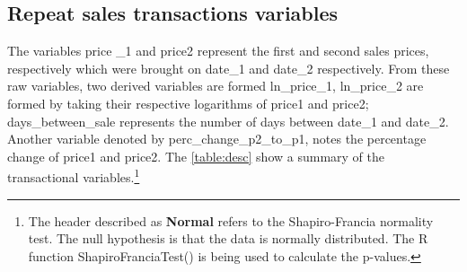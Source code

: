\documentclass[12pt]{article}
\begin{document}
\subsection{Repeat sales transactions variables}
The variables price \_1 and \gls{price2} represent the first and second sales prices, respectively which were brought on date\_1 and date\_2 respectively. From these raw variables, two derived variables are formed ln\_price\_1, ln\_price\_2 are formed by taking their respective logarithms of \gls{price1} and \gls{price2}; days\_between\_sale represents the number of days between date\_1 and date\_2. Another variable denoted by perc\_change\_p2\_to\_p1, notes the percentage change of \gls{price1} and \gls{price2}.
The \autoref{table:desc} show a summary of the transactional variables.\footnote{The header described as \textbf{Normal} refers to the Shapiro-Francia normality test. The null hypothesis is that the data is normally distributed. The R function ShapiroFranciaTest() is being used to calculate the p-values.}
\begin{table}[H]
\caption{Descriptive statistics of the transactional variables}
\label{table:desc}
\end{table}
\end{document}
